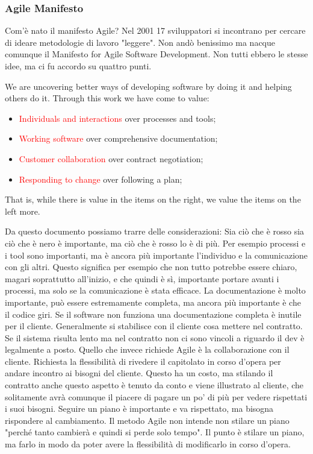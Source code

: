 \begin{itemize}
	\subsubsection{Agile Manifesto}
	Com'è nato il manifesto Agile? Nel 2001 17 sviluppatori si incontrano per cercare di ideare metodologie di lavoro "leggere". Non andò benissimo ma nacque comunque il Manifesto for Agile Software Development. Non tutti ebbero le stesse idee, ma ci fu accordo su quattro punti.
	\begin{info}[MANIFESTO]
		\newline We are uncovering better ways of developing
		software by doing it and helping others do it.\newline
		Through this work we have come to value:
		\begin{itemize}
			\item \textcolor{red}{Individuals and interactions} over processes and tools;
			\item \textcolor{red}{Working software} over comprehensive documentation;
			\item \textcolor{red}{Customer collaboration} over contract negotiation;
			\item \textcolor{red}{Responding to change} over following a plan;
		\end{itemize}
		That is, while there is value in the items on
		the right, we value the items on the left more.
	\end{info}
	Da questo documento possiamo trarre delle considerazioni:\newline
	Sia ciò che è rosso sia ciò che è nero è importante, ma ciò che è rosso lo è di più. Per esempio processi e i tool sono importanti, ma è ancora più importante l'individuo e la comunicazione con gli altri. Questo significa per esempio che non tutto potrebbe essere chiaro, magari soprattutto all'inizio, e che quindi è sì, importante portare avanti i processi, ma solo se la comunicazione è stata efficace.\newline
	La documentazione è molto importante, può essere estremamente completa, ma ancora più importante è che il codice giri. Se il software non funziona una documentazione completa è inutile per il cliente.\newline
	Generalmente si stabilisce con il cliente cosa mettere nel contratto. Se il sistema risulta lento ma nel contratto non ci sono vincoli a riguardo il dev è legalmente a posto. Quello che invece richiede Agile è la collaborazione con il cliente. Richiesta la flessibilità di rivedere il capitolato in corso d'opera per andare incontro ai bisogni del cliente. Questo ha un costo, ma stilando il contratto anche questo aspetto è tenuto da conto e viene illustrato al cliente, che solitamente avrà comunque il piacere di pagare un po' di più per vedere rispettati i suoi bisogni.\newline
	Seguire un piano è importante e va rispettato, ma bisogna rispondere al cambiamento. Il metodo Agile non intende non stilare un piano "perché tanto cambierà e quindi si perde solo tempo". Il punto è stilare un piano, ma farlo in modo da poter avere la flessibilità di modificarlo in corso d'opera.
\end{itemize}
